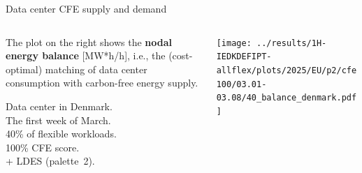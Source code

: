 \begin{frame}{Data center CFE supply and demand}
  \label{nbp2-DK-40}

  {\footnotesize
  
  \begin{columns}[T]
    \begin{column}{3.5cm}
      \vspace{0.3cm}
      The plot on the right shows the {\bf nodal energy balance} [MW*h/h], i.e., the (cost-optimal) matching of data center consumption with carbon-free energy supply.

      \vspace{0.2cm}
      Data center in Denmark. \\
      The first week of March. \\
      40\% of flexible workloads.\\
      100\% CFE score.\\
      + LDES (palette~2). \\

    \end{column}
  
    \begin{column}{11cm}
      \texttt{[image: ../results/1H-IEDKDEFIPT-allflex/plots/2025/EU/p2/cfe100/03.01-03.08/40\_balance\_denmark.pdf]}
    \end{column}
    \end{columns}
    } 

\end{frame}



